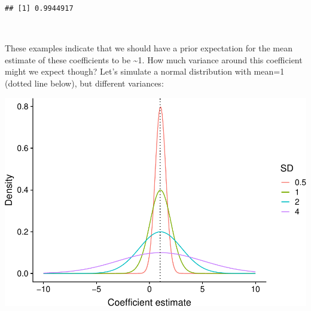 \documentclass[11pt,]{article}
\newenvironment{Shaded}{}{}
\newcommand{\KeywordTok}[1]{\textcolor[rgb]{0.00,0.00,1.00}{#1}}
\newcommand{\DecValTok}[1]{#1}
\newcommand{\StringTok}[1]{\textcolor[rgb]{0.00,0.50,0.50}{#1}}
\newcommand{\CommentTok}[1]{\textcolor[rgb]{0.00,0.50,0.00}{#1}}
\newcommand{\OperatorTok}[1]{#1}
\newcommand{\NormalTok}[1]{#1}
\let\origfigure\figure
\let\endorigfigure\endfigure
\renewenvironment{figure}[1][2] {
    \expandafter\origfigure\expandafter[H]
} {
    \endorigfigure
}
\begin{document}
\begin{Shaded}
\end{Shaded}

\begin{verbatim}
## [1] 0.9944917
\end{verbatim}

~

These examples indicate that we should have a prior expectation for the
mean estimate of these coefficients to be \textasciitilde{}1. How much
variance around this coefficient might we expect though? Let's simulate
a normal distribution with mean=1 (dotted line below), but different
variances:

\begin{figure}
\centering
\includegraphics{reproduce_analyses_files/figure-latex/simulate prior distribution for normalized degree-1.pdf}
\caption{Potential prior distributions for the effect of scaled
normalized degree.}
\end{figure}
\end{document}
